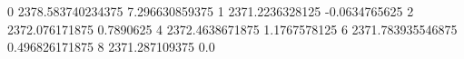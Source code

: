 0 2378.583740234375 7.296630859375
1 2371.2236328125 -0.0634765625
2 2372.076171875 0.7890625
4 2372.4638671875 1.1767578125
6 2371.783935546875 0.496826171875
8 2371.287109375 0.0
